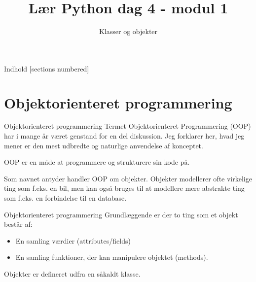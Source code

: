 \documentclass[main.tex]{subfiles}
\title{Lær Python dag 4 - modul 1}
\subtitle{Klasser og objekter}
\begin{document}
\maketitle

\begin{frame}{Indhold}
  [sections numbered]
  \tableofcontents[hideallsubsections]
\end{frame}


\section{Objektorienteret programmering}

\begin{frame}{Objektorienteret programmering}
	Termet Objektorienteret Programmering (OOP) har i mange år været genstand for en del diskussion. Jeg forklarer her, hvad jeg mener er den mest udbredte og naturlige anvendelse af konceptet.

	\pause
	\medskip
	OOP er en måde at programmere og strukturere sin kode på.
	
	\pause
	\medskip
	
	Som navnet antyder handler OOP om objekter. Objekter modellerer ofte virkelige ting som f.eks. en bil, men kan også bruges til at modellere mere abstrakte ting som f.eks. en forbindelse til en database.

\end{frame}


\begin{frame}{Objektorienteret programmering}
	Grundlæggende er der to ting som et objekt består af:
	\begin{itemize}
		\item En samling værdier (attributes/fields)
		\item En samling funktioner, der kan manipulere objektet (methods).
	\end{itemize}

	\pause
	Objekter er defineret udfra en såkaldt klasse.
\end{frame}
\end{document}
